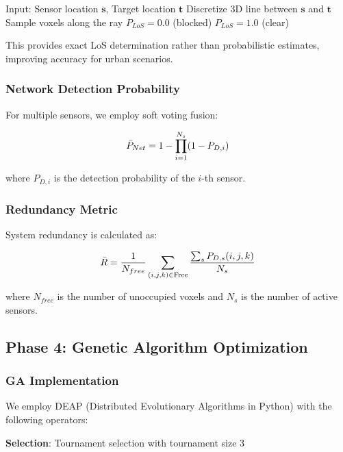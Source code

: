 \begin{algorithmic}
\STATE Input: Sensor location $\mathbf{s}$, Target location $\mathbf{t}$
\STATE Discretize 3D line between $\mathbf{s}$ and $\mathbf{t}$
\STATE Sample voxels along the ray
  \STATE $P_{LoS} = 0.0$ (blocked)
\ELSE
  \STATE $P_{LoS} = 1.0$ (clear)
\ENDIF
\end{algorithmic}

This provides exact LoS determination rather than probabilistic estimates, improving accuracy for urban scenarios.

\subsubsection{Network Detection Probability}

For multiple sensors, we employ soft voting fusion:

\begin{equation}
\bar{P}_{Net} = 1 - \prod_{i=1}^{N_s} (1 - P_{D,i})
\label{eq:pnet}
\end{equation}

where $P_{D,i}$ is the detection probability of the $i$-th sensor.

\subsubsection{Redundancy Metric}

System redundancy is calculated as:

\begin{equation}
\bar{R} = \frac{1}{N_{free}} \sum_{(i,j,k) \in \text{Free}} \frac{\sum_s P_{D,s}(i,j,k)}{N_s}
\label{eq:redundancy}
\end{equation}

where $N_{free}$ is the number of unoccupied voxels and $N_s$ is the number of active sensors.

\subsection{Phase 4: Genetic Algorithm Optimization}

\subsubsection{GA Implementation}

We employ DEAP (Distributed Evolutionary Algorithms in Python) with the following operators:

\textbf{Selection}: Tournament selection with tournament size 3

